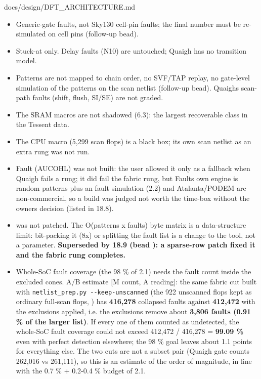 \begin{relocated}{docs/design/DFT_ARCHITECTURE.md}
\begin{itemize}
\tightlist
\item
  Generic-gate faults, not Sky130 cell-pin faults; the final number must
  be re-simulated on cell pins (follow-up bead).
\item
  Stuck-at only. Delay faults (N10) are untouched; Quaigh has no
  transition model.
\item
  Patterns are not mapped to chain order, no SVF/TAP replay, no
  gate-level simulation of the patterns on the scan netlist (follow-up
  bead). Quaigh\textquotesingle s scan-path faults (shift, flush, SI/SE)
  are not graded.
\item
  The SRAM macros are not shadowed (6.3): the largest recoverable class
  in the Tessent data.
\item
  The CPU macro (5,299 scan flops) is a black box; its own scan netlist
  as an extra rung was not run.
\item
  Fault (AUCOHL) was not built: the user allowed it only as a fallback
  when Quaigh fails a rung; it did fail the fabric rung, but
  Fault\textquotesingle s own engine is random patterns plus an
   fault simulation (2.2) and Atalanta/\allowbreak{}PODEM
  are non-commercial, so a build was judged not worth the time-box
  without the owner\textquotesingle s decision (listed in 18.8).
\item
   was not patched. The O(patterns x faults) byte matrix is
  a data-structure limit: bit-packing it (8x) or splitting the fault
  list is a change to the tool, not a parameter. \textbf{Superseded by
  18.9 (bead ): a sparse-row patch fixed it and the fabric
  rung completes.}
\item
  Whole-SoC fault coverage (the 98 \% of 2.1) needs the fault count
  inside the excluded cones. A/B estimate {[}M count, A reading{]}: the
  same fabric cut built with
  \texttt{netlist\_\allowbreak{}prep.\allowbreak{}py\ -\allowbreak{}-\allowbreak{}keep-\allowbreak{}unscanned}
  (the 922 unscanned flops kept as ordinary full-scan flops,
  ) has \textbf{416,278} collapsed faults against
  \textbf{412,472} with the exclusions applied, i.e. the exclusions
  remove about \textbf{3,806 faults (0.91 \% of the larger list)}. If
  every one of them counted as undetected, the whole-SoC fault coverage
  could not exceed 412,472 / 416,278 = \textbf{99.09 \%} even with
  perfect detection elsewhere; the 98 \% goal leaves about 1.1 points
  for everything else. The two cuts are not a subset pair (Quaigh gate
  counts 262,016 vs 261,111), so this is an estimate of the order of
  magnitude, in line with the 0.7 \% + 0.2-0.4 \% budget of 2.1.
\end{itemize}


\end{relocated}
